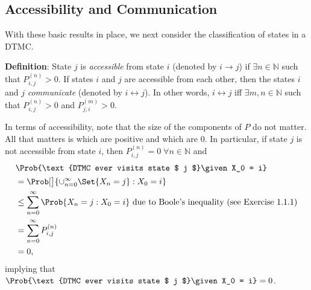 \subsection*{Accessibility and Communication}
With these basic results in place, we next consider the classification of states in a DTMC\@.
\begin{Regular}
    \textbf{Definition}: State $ j $ is \emph{accessible} from state $ i $ (denoted by $ i\to j $) if $ \exists n\in\mathbb{N} $
    such that $ P_{i,j}^{(n)}>0 $. If states $ i $ and $ j $ are accessible from each other, then the states $ i $ and $ j $
    \emph{communicate} (denoted by $ i\leftrightarrow j $). In other words, $ i\leftrightarrow j $ iff $ \exists m,n\in\mathbb{N} $
    such that $ P_{i,j}^{(n)}>0 $ and $ P_{j,i}^{(m)}>0 $.

    \tcblower{}
    In terms of accessibility, note that the size of the components of $ P $ do not matter. All that
    matters is which are positive and which are $0$. In particular, if state $ j $ is not accessible from
    state $ i $, then $ P_{i,j}^{(n)}=0\;\forall n\in\mathbb{N} $ and
    \begin{align*}
        \begin{aligned}
             & \Prob{\text{DTMC ever visits state $ j $}\given X_0 = i}                                                       \\
             & = \Prob[\big]{\cup_{n=0}^{\infty}\Set{X_{n}=j} \given X_{0}=i}                                                 \\
             & \leq  \sum_{n=0}^{\infty} \Prob{X_{n}=j \given X_{0}=i} \text{ due to Boole's inequality (see Exercise 1.1.1)} \\
             & = \sum_{n=0}^{\infty} P_{i,j}^{(n)}                                                                            \\
             & =0,
        \end{aligned}
    \end{align*}
    implying that $ \Prob{\text{DTMC ever visits state $ j $}\given X_0 = i} = 0 $.
\end{Regular}
